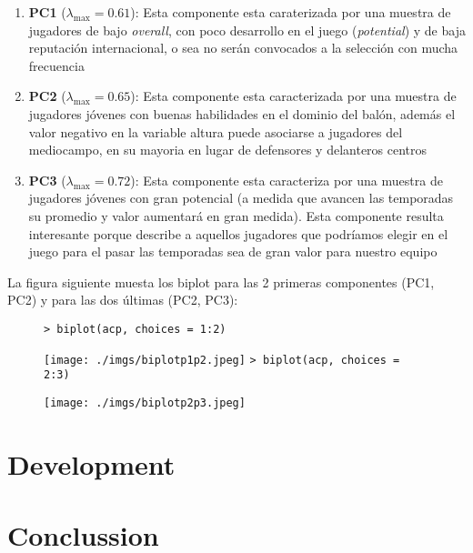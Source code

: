 \documentclass[a4paper,10pt,twocolumn]{article}
\begin{document}
\begin{enumerate}
	\item[] \textbf{PC1} ($\lambda_{\max} = 0.61$): Esta componente esta caraterizada por una muestra de jugadores de bajo \textit{overall}, con poco desarrollo en el juego (\textit{potential}) y de baja reputaci\'on internacional, o sea no ser\'an convocados a la selecci\'on con mucha frecuencia
	
	\item[] \textbf{PC2} ($\lambda_{\max} = 0.65$): Esta componente esta caracterizada por una muestra de
	jugadores j\'ovenes con buenas habilidades en el dominio del bal\'on, adem\'as el valor negativo en la variable altura puede asociarse a jugadores del mediocampo, en su mayoria en lugar de defensores y delanteros centros
	
	\item[] \textbf{PC3} ($\lambda_{\max} = 0.72$): Esta componente esta caracteriza por una muestra de 
	jugadores j\'ovenes con gran potencial (a medida que avancen las temporadas su promedio y valor aumentar\'a en gran medida). Esta componente resulta interesante porque describe a aquellos jugadores que podr\'iamos elegir en el juego para el pasar las temporadas sea de gran valor para nuestro equipo 
\end{enumerate} 

La figura siguiente muesta los biplot para las 2 primeras componentes (PC1, PC2) y para las dos \'ultimas (PC2, PC3):

\begin{figure}[h]
	\verb|> biplot(acp, choices = 1:2)|
	
	\texttt{[image: ./imgs/biplotp1p2.jpeg]}
	\verb|> biplot(acp, choices = 2:3)|
	
	\texttt{[image: ./imgs/biplotp2p3.jpeg]}
\end{figure}

\section*{Development}\label{sec:dev}
  
\lipsum[6-8]

\section*{Conclussion}\label{sec:con}

\lipsum[9-11]

\begin{thebibliography}{9}
	
\end{thebibliography}

\label{end}
\end{document}
